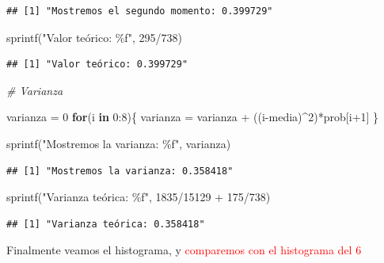 \documentclass[
]{article}
\newenvironment{Shaded}{\begin{snugshade}}{\end{snugshade}}
\newcommand{\CommentTok}[1]{\textcolor[rgb]{0.56,0.35,0.01}{\textit{#1}}}
\newcommand{\ControlFlowTok}[1]{\textcolor[rgb]{0.13,0.29,0.53}{\textbf{#1}}}
\newcommand{\DecValTok}[1]{\textcolor[rgb]{0.00,0.00,0.81}{#1}}
\newcommand{\FunctionTok}[1]{\textcolor[rgb]{0.00,0.00,0.00}{#1}}
\newcommand{\NormalTok}[1]{#1}
\newcommand{\OtherTok}[1]{\textcolor[rgb]{0.56,0.35,0.01}{#1}}
\newcommand{\SpecialCharTok}[1]{\textcolor[rgb]{0.00,0.00,0.00}{#1}}
\newcommand{\StringTok}[1]{\textcolor[rgb]{0.31,0.60,0.02}{#1}}
\begin{document}
\begin{verbatim}
## [1] "Mostremos el segundo momento: 0.399729"
\end{verbatim}

\begin{Shaded}
\begin{Highlighting}[]
\FunctionTok{sprintf}\NormalTok{(}\StringTok{"Valor teórico: \%f"}\NormalTok{, }\DecValTok{295}\SpecialCharTok{/}\DecValTok{738}\NormalTok{)}
\end{Highlighting}
\end{Shaded}

\begin{verbatim}
## [1] "Valor teórico: 0.399729"
\end{verbatim}

\begin{Shaded}
\begin{Highlighting}[]
\CommentTok{\# Varianza}

\NormalTok{varianza }\OtherTok{=} \DecValTok{0}
\ControlFlowTok{for}\NormalTok{(i }\ControlFlowTok{in} \DecValTok{0}\SpecialCharTok{:}\DecValTok{8}\NormalTok{)\{}
\NormalTok{  varianza }\OtherTok{=}\NormalTok{ varianza }\SpecialCharTok{+}\NormalTok{ ((i}\SpecialCharTok{{-}}\NormalTok{media)}\SpecialCharTok{\^{}}\DecValTok{2}\NormalTok{)}\SpecialCharTok{*}\NormalTok{prob[i}\SpecialCharTok{+}\DecValTok{1}\NormalTok{]}
\NormalTok{\}}

\FunctionTok{sprintf}\NormalTok{(}\StringTok{"Mostremos la varianza: \%f"}\NormalTok{, varianza)}
\end{Highlighting}
\end{Shaded}

\begin{verbatim}
## [1] "Mostremos la varianza: 0.358418"
\end{verbatim}

\begin{Shaded}
\begin{Highlighting}[]
\FunctionTok{sprintf}\NormalTok{(}\StringTok{"Varianza teórica: \%f"}\NormalTok{, }\DecValTok{1835}\SpecialCharTok{/}\DecValTok{15129} \SpecialCharTok{+} \DecValTok{175}\SpecialCharTok{/}\DecValTok{738}\NormalTok{)}
\end{Highlighting}
\end{Shaded}

\begin{verbatim}
## [1] "Varianza teórica: 0.358418"
\end{verbatim}

Finalmente veamos el histograma, y
\textcolor{red}{comparemos con el histograma del 6}
\end{document}
